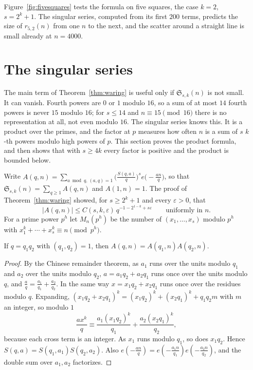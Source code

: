 Figure~\ref{fig:fivesquares} tests the formula on five squares, the case $k=2$, $s=2^k+1$. The singular series, computed from its first $200$ terms, predicts the size of $r_{5,2}(n)$ from one $n$ to the next, and the scatter around a straight line is small already at $n=4000$.

\section{The singular series}

The main term of Theorem~\ref{thm:waring} is useful only if $\mathfrak S_{s,k}(n)$ is not small. It can vanish. Fourth powers are $0$ or $1$ modulo $16$, so a sum of at most $14$ fourth powers is never $15$ modulo $16$; for $s\le14$ and $n\equiv15\pmod{16}$ there is no representation at all, not even modulo $16$. The singular series knows this. It is a product over the primes, and the factor at $p$ measures how often $n$ is a sum of $s$ $k$-th powers modulo high powers of $p$. This section proves the product formula, and then shows that with $s\ge4k$ every factor is positive and the product is bounded below.

Write $A(q,n)=\sum_{a\bmod q,\,(a,q)=1}\bigl(\frac{S(q,a)}q\bigr)^se\bigl(-\frac{an}q\bigr)$, so that $\mathfrak S_{s,k}(n)=\sum_{q\ge1}A(q,n)$ and $A(1,n)=1$. The proof of Theorem~\ref{thm:waring} showed, for $s\ge2^k+1$ and every $\varepsilon>0$, that
\[
|A(q,n)|\le C(s,k,\varepsilon)\,q^{-1-2^{1-k}+s\varepsilon}\qquad\text{uniformly in }n.\tag{$\ddagger$}
\]
For a prime power $p^h$ let $M_n(p^h)$ be the number of $(x_1,\dots,x_s)$ modulo $p^h$ with $x_1^k+\cdots+x_s^k\equiv n\pmod{p^h}$.

\begin{lemma}\label{lem:amult}
If $q=q_1q_2$ with $(q_1,q_2)=1$, then $A(q,n)=A(q_1,n)A(q_2,n)$.
\end{lemma}
\begin{proof}
By the Chinese remainder theorem, as $a_1$ runs over the units modulo $q_1$ and $a_2$ over the units modulo $q_2$, $a=a_1q_2+a_2q_1$ runs once over the units modulo $q$, and $\frac aq=\frac{a_1}{q_1}+\frac{a_2}{q_2}$. In the same way $x=x_1q_2+x_2q_1$ runs once over the residues modulo $q$. Expanding, $(x_1q_2+x_2q_1)^k=(x_1q_2)^k+(x_2q_1)^k+q_1q_2m$ with $m$ an integer, so modulo $1$
\[
\frac{ax^k}q\equiv\frac{a_1(x_1q_2)^k}{q_1}+\frac{a_2(x_2q_1)^k}{q_2},
\]
because each cross term is an integer. As $x_1$ runs modulo $q_1$, so does $x_1q_2$. Hence $S(q,a)=S(q_1,a_1)S(q_2,a_2)$. Also $e(-\frac{an}q)=e(-\frac{a_1n}{q_1})e(-\frac{a_2n}{q_2})$, and the double sum over $a_1,a_2$ factorizes.
\end{proof}

